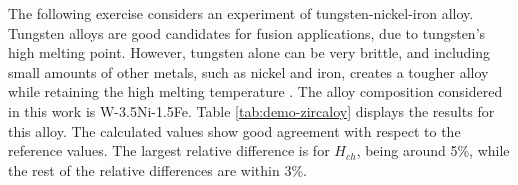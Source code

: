 The following exercise considers an experiment of tungsten-nickel-iron alloy.
% 
Tungsten alloys are good candidates for fusion applications, due to tungsten's high melting point.
However, tungsten alone can be very brittle, and including small amounts of other metals, such as nickel and iron, creates a tougher alloy while retaining the high melting temperature \cite{wong_metals_2023}.
The alloy composition considered in this work is W-3.5Ni-1.5Fe.
%
Table \ref{tab:demo-zircaloy} displays the results for this alloy.
The calculated values show good agreement with respect to the reference values.
The largest relative difference is for $H_{ch}$, being around 5\%, while the rest of the relative differences are within 3\%.



